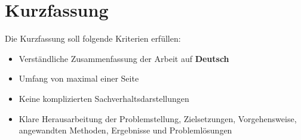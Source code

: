 \chapter{Kurzfassung}
	Die Kurzfassung soll folgende Kriterien erfüllen:
	\begin{itemize}
		\item Verständliche Zusammenfassung der Arbeit auf \textbf{Deutsch}
		\item Umfang von maximal einer Seite
		\item Keine komplizierten Sachverhaltsdarstellungen
		\item Klare Herausarbeitung der Problemstellung, Zielsetzungen, Vorgehensweise, angewandten Methoden, Ergebnisse und Problemlösungen
	\end{itemize}